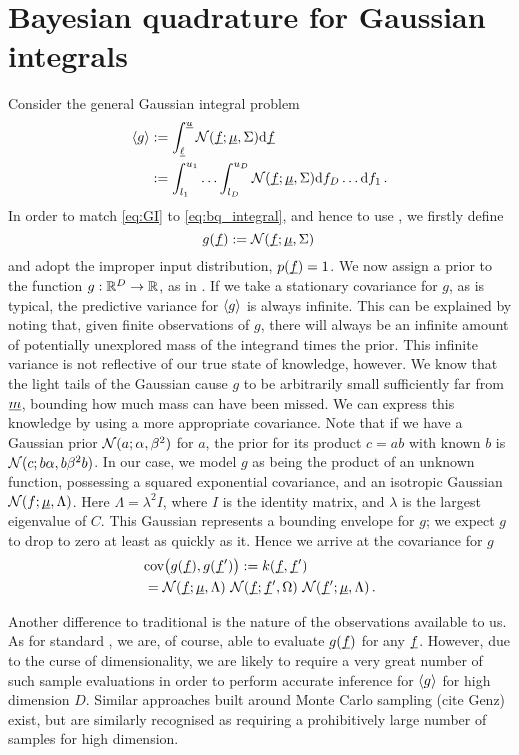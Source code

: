 \documentclass[twoside]{article}
\begin{document}
\section{Bayesian quadrature for Gaussian integrals}

Consider the general Gaussian integral problem
\begin{align}\label{eq:GI}
\langle g \rangle & := \int_{\underline{\smash{\ell}}}^{\underline{\smash{u}}} \mathcal{N}(\underline{\smash{f}};\underline{\smash{\mu}},\Sigma) \mathrm{d} \underline{\smash{f}}\nonumber\\
& := \int_{l_1}^{u_1}\ldots\int_{l_D}^{u_D} \mathcal{N}(\underline{\smash{f}};\underline{\smash{\mu}},\Sigma) \mathrm{d} f_D \ldots \mathrm{d} f_1\,.
\end{align}
In order to match \eqref{eq:GI} to \eqref{eq:bq_integral}, and hence to use \bq, we firstly define 
\begin{equation}
 g(\underline{\smash{f}}) := \mathcal{N}(\underline{\smash{f}};\underline{\smash{\mu}},\Sigma)\,
\end{equation}
and adopt the improper input distribution, $p(\underline{\smash{f}}) = 1$. We now assign a \gp prior 
to the function $g: \mathbb{R}^D \to \mathbb{R}$, as in \bq. If we take a stationary covariance for $g$, as is typical, the predictive variance for $\langle g \rangle$ is always infinite. This can be explained by noting that, given finite observations of $g$, there will always be an infinite amount of potentially unexplored mass of the integrand times the prior. This infinite variance is not reflective of our true state of knowledge, however. We know that the light tails of the Gaussian cause $g$ to be arbitrarily small sufficiently far from $\underline{\smash{m}}$, bounding how much mass can have been missed. We can express this knowledge by using a more appropriate covariance. Note that if we have a Gaussian prior $\mathcal{N}(a;\alpha,\beta^2)$ for $a$, the prior for its product $c = a b$ with known $b$ is $\mathcal{N}(c;b \alpha,b \beta^2 b)$. In our case, we model $g$ as being the product of an unknown function, possessing a squared 
exponential covariance, and an isotropic Gaussian $\mathcal{N}(f;\underline{\smash{\mu}},\Lambda)$. Here $\Lambda = \lambda^2 I$, where $I$ is the identity matrix, and $\lambda$ is the largest eigenvalue of $C$. This Gaussian represents a bounding envelope for $g$; we expect $g$ to drop to zero at least as quickly as it. Hence we arrive at the covariance for $g$
\begin{align}
 & \text{cov}\bigl(g(\underline{\smash{f}}), g(\underline{\smash{f}}')\bigr) := k(\underline{\smash{f}}, \underline{\smash{f}}')\nonumber\\ & = \mathcal{N}(\underline{\smash{f}};\underline{\smash{\mu}},\Lambda)~\mathcal{N}(\underline{\smash{f}};\underline{\smash{f}}',\Omega)~\mathcal{N}(\underline{\smash{f}}';\underline{\smash{\mu}},\Lambda)\,.
\end{align}

Another difference to traditional  is the nature of the observations available to us. As for standard , we are, of course, able to evaluate $g(\underline{\smash{f}})$ for any $\underline{\smash{f}}$. However, due to the curse of dimensionality, we are likely to require a very great number of such sample evaluations in order to perform accurate inference for $\langle g \rangle$ for high dimension $D$. Similar approaches built around Monte Carlo sampling (cite Genz) exist, but are similarly recognised as requiring a prohibitively large number of samples for high dimension. 
\end{document}

